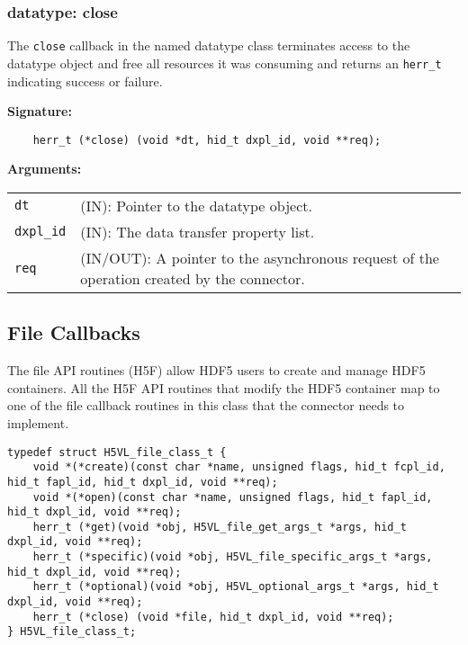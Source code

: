 \subsubsection{datatype: close}
The \texttt{close} callback in the named datatype class terminates
access to the datatype object and free all resources it was
consuming and returns an \texttt{herr\_t} indicating success or failure.\bigskip

\begin{mdframed}[style=bgbox]
\textbf{Signature:}
\begin{lstlisting}
    herr_t (*close) (void *dt, hid_t dxpl_id, void **req);
\end{lstlisting}

\textbf{Arguments:}\\
\begin{tabular}{l p{13.5cm}}
  \texttt{dt} & (IN): Pointer to the datatype object.\\
  \texttt{dxpl\_id} & (IN): The data transfer property list.\\
  \texttt{req} & (IN/OUT): A pointer to the asynchronous request of the
  operation created by the connector.\\
\end{tabular}
\end{mdframed}



\subsection{File Callbacks}
The file API routines (H5F) allow HDF5 users to create and manage HDF5
containers. All the H5F API routines that modify the HDF5 container
map to one of the file callback routines in this class that the connector
needs to implement.

\begin{lstlisting}[caption={File class for file API routines, H5VLconnector.h}, captionpos=b, label={lst:Fileclass}]
typedef struct H5VL_file_class_t {                                               
    void *(*create)(const char *name, unsigned flags, hid_t fcpl_id, hid_t fapl_id, hid_t dxpl_id, void **req);                   
    void *(*open)(const char *name, unsigned flags, hid_t fapl_id, hid_t dxpl_id, void **req);
    herr_t (*get)(void *obj, H5VL_file_get_args_t *args, hid_t dxpl_id, void **req);
    herr_t (*specific)(void *obj, H5VL_file_specific_args_t *args, hid_t dxpl_id, void **req);            
    herr_t (*optional)(void *obj, H5VL_optional_args_t *args, hid_t dxpl_id, void **req);
    herr_t (*close) (void *file, hid_t dxpl_id, void **req);
} H5VL_file_class_t; 
\end{lstlisting}


